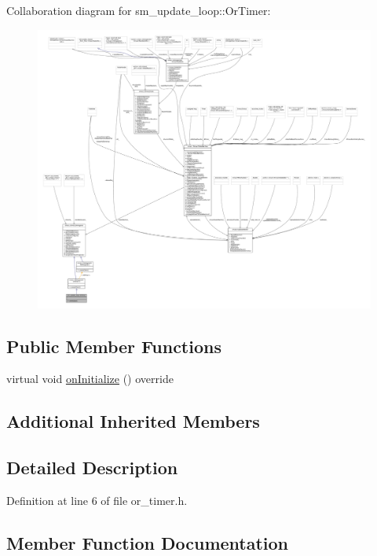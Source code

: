 Collaboration diagram for sm\+\_\+update\+\_\+loop\+:\+:Or\+Timer\+:
\nopagebreak
\begin{figure}[H]
\begin{center}
\leavevmode
\includegraphics[width=350pt]{classsm__update__loop_1_1OrTimer__coll__graph}
\end{center}
\end{figure}
\subsection*{Public Member Functions}
\begin{DoxyCompactItemize}
\item 
virtual void \hyperlink{classsm__update__loop_1_1OrTimer_af2b4637bc236bcaada12b703c5f0a110}{on\+Initialize} () override
\end{DoxyCompactItemize}
\subsection*{Additional Inherited Members}


\subsection{Detailed Description}


Definition at line 6 of file or\+\_\+timer.\+h.



\subsection{Member Function Documentation}
